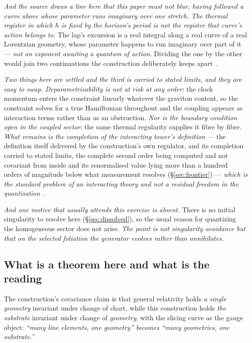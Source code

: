 \documentclass[11pt,a4paper]{article}
\theoremstyle{plain}
\theoremstyle{definition}
\begin{document}
\emph{And the source draws a line here that this paper must not blur, having followed a curve above whose
parameter runs imaginary over one stretch.} \emph{The thermal register
in which $\hbar$ is fixed by the horizon's period is not the register that curve's action belongs to.} The
lap's excursion is a real integral along a real curve of a real Lorentzian geometry, whose parameter happens
to run imaginary over part of it --- \emph{not an exponent awaiting a quantum of action}. Dividing the one by
the other would join two continuations the construction deliberately keeps
apart~\cite{JanzenCanonicalTime}.

\emph{Two things here are settled and the third is carried to stated limits, and they are easy to swap.} \emph{Deparametrizability is not
at risk at any order}: the clock momentum enters the constraint linearly whatever the graviton content, so
the constraint solves for a true Hamiltonian throughout and the coupling appears as interaction terms rather
than as an obstruction. \emph{Nor is the boundary condition open in the coupled sector}: the same thermal
regularity supplies it fibre by fibre. \emph{What remains is the completion of the interacting tower's
definition} --- the definition itself delivered by the construction's own regulator, and its completion carried
to stated limits, the complete second order being computed and not covariant from inside and its renormalised
value lying more than a hundred orders of magnitude below what measurement resolves (\S\ref{sec:frontier}) --- \emph{which is the standard problem of an interacting theory and not
a residual freedom in the quantization}~\cite{JanzenCanonicalTime}.

\emph{And one motive that usually attends this exercise is absent.} There is no initial singularity to
resolve here (\S\ref{sec:dissolved}), so the usual reason for quantizing the homogeneous sector does not
arise. \emph{The point is not singularity avoidance but that on the selected foliation the generator evolves
rather than annihilates.}

\subsection{What is a theorem here and what is the reading}

The construction's covariance claim is that general relativity holds \emph{a single geometry} invariant
under change of chart, while this construction holds \emph{the substrate} invariant under change of
\emph{geometry}, with the slicing curve as the gauge object: \emph{``many line elements, one geometry''
becomes ``many geometries, one substrate.''}
\end{document}
